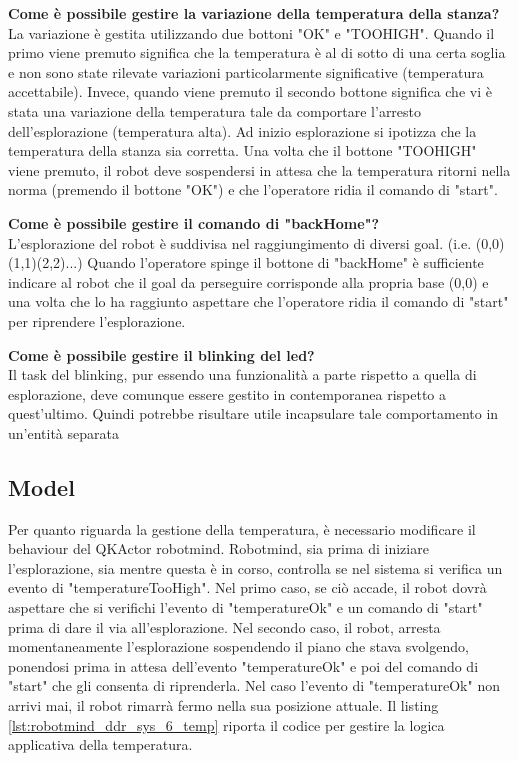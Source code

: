 \textbf{Come è possibile gestire la variazione della temperatura della stanza?}\\

La variazione è gestita utilizzando due bottoni "OK" e "TOOHIGH". Quando il primo viene premuto significa che la temperatura è al di sotto di una certa soglia e non sono state rilevate variazioni particolarmente significative (temperatura accettabile). Invece, quando viene premuto il secondo bottone significa che vi è stata una variazione della temperatura tale da comportare l'arresto dell'esplorazione (temperatura alta).
Ad inizio esplorazione si ipotizza che la temperatura della stanza sia corretta. Una volta che  il bottone "TOOHIGH" viene premuto, il robot deve sospendersi in attesa che la temperatura ritorni nella norma (premendo il bottone "OK") e che l'operatore ridia il comando di "start".

\textbf{Come è possibile gestire il comando di "backHome"?}\\
L'esplorazione del robot è suddivisa nel raggiungimento di diversi goal. (i.e. (0,0)(1,1)(2,2)...) Quando l'operatore spinge il bottone di "backHome" è sufficiente indicare al robot che il goal da perseguire corrisponde alla propria base (0,0) e una volta che lo ha raggiunto aspettare che l'operatore ridia il comando di "start" per riprendere l'esplorazione. 

\textbf{Come è possibile gestire il blinking del led?}\\
Il task del blinking, pur essendo una funzionalità a parte rispetto a quella di esplorazione, deve comunque essere gestito in contemporanea rispetto a quest'ultimo. Quindi potrebbe risultare utile incapsulare tale comportamento in un'entità separata


\subsection{Model}

Per quanto riguarda la gestione della temperatura, è necessario modificare il behaviour del QKActor robotmind. Robotmind, sia prima di iniziare l'esplorazione, sia mentre questa è in corso, controlla se nel sistema si verifica un evento di "temperatureTooHigh". Nel primo caso, se ciò accade, il robot dovrà aspettare che si verifichi l'evento di "temperatureOk" e un comando di "start" prima di dare il via all'esplorazione. Nel secondo caso, il robot, arresta momentaneamente l'esplorazione sospendendo il piano che stava svolgendo, ponendosi prima in attesa dell'evento "temperatureOk" e poi del comando di "start" che gli consenta di riprenderla. Nel caso l'evento di "temperatureOk" non arrivi mai, il robot rimarrà fermo nella sua posizione attuale.
Il listing \ref{lst:robotmind_ddr_sys_6_temp} riporta il codice per gestire la logica applicativa della temperatura.


